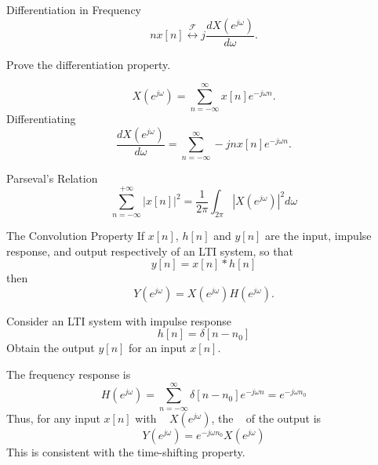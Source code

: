 \begin{frame}{Differentiation in Frequency}
    \begin{equation*}
        nx[n] \overset{\mathcal{F}}{\leftrightarrow} j \frac{d X(e^{j\omega})}{d\omega}.
    \end{equation*}
    \begin{example}
        Prove the differentiation property.
    \end{example}
    \pause
    {
        \begin{equation*}
            X(e^{j\omega}) = \sum_{n=-\infty}^{\infty}x[n] e^{-j\omega n}.
        \end{equation*}
        Differentiating
        \begin{equation*}
            \frac{d X(e^{j\omega})}{d\omega} = \sum_{n=-\infty}^{\infty}-jnx[n] e^{-j\omega n}.
        \end{equation*}
    }
\end{frame}
%
\begin{frame}{Parseval's Relation}
    \begin{equation*}
        \sum_{n=-\infty}^{+\infty}|x[n]|^2 = \frac{1}{2\pi}\int_{2\pi} | X(e^{j\omega})|^2d\omega
    \end{equation*}
\end{frame}

\begin{frame}{The Convolution Property}
    If $x[n]$, $h[n]$ and $y[n]$ are the input, impulse response, and output respectively of an LTI system, so that
    \begin{equation*}
        y[n] = x[n]\ast h[n]
    \end{equation*}
    then
    \begin{equation*}
        Y(e^{j\omega}) = X(e^{j\omega})H(e^{j\omega}).
    \end{equation*}

    \begin{example}
        Consider an LTI system with impulse response
        \begin{equation*}
          h[n] = \delta[n-n_0]
        \end{equation*}
        Obtain the output $y[n]$ for an input $x[n]$.
    \end{example}
\end{frame}



\begin{frame}
    {
        The frequency response is
        \begin{equation*}
            H(e^{j\omega}) = \sum_{n=-\infty}^{\infty} \delta[n-n_0] e^{-j\omega n} = e^{-j\omega n_0}
        \end{equation*}
        Thus,  for any input $x[n]$ with \ft~ $X(e^{j\omega})$, the \ft~ of the output is
        \begin{equation*}
            Y(e^{j\omega}) =  e^{-j\omega n_0}X(e^{j\omega})
        \end{equation*}
        This is consistent with the time-shifting property.
    }
\end{frame}



